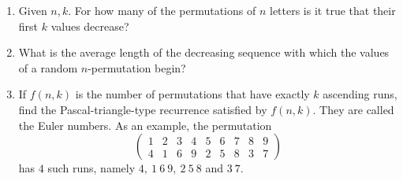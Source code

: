 \begin{exercise}
    \begin{enumerate}[label=(\alph*)]
        \item Given $n,k$. For how many of the permutations of $n$ letters is it true that their first $k$ values decrease?
        \item What is the average length of the decreasing sequence with which the values of a random $n$-permutation begin?
        \item If $f(n,k)$ is the number of permutations that have exactly $k$ ascending runs, find the Pascal-triangle-type recurrence satisfied by $f(n,k)$. They are called the Euler numbers. As an example, the permutation
        \[
            \begin{pmatrix}
                1 & 2 & 3 & 4 & 5 & 6 & 7 & 8 & 9 \\
                4 & 1 & 6 & 9 & 2 & 5 & 8 & 3 & 7
            \end{pmatrix}
        \]
        has $4$ such runs, namely $4,\ 1\ 6\ 9,\ 2\ 5\ 8$ and $3\ 7$.
    \end{enumerate}
\end{exercise}
